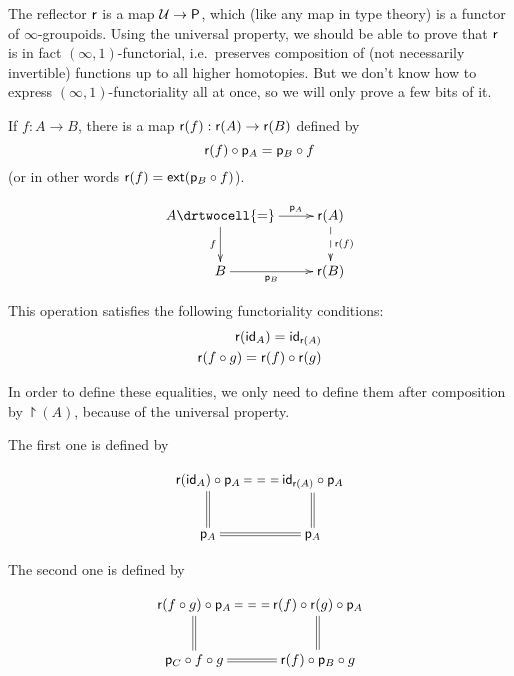 The reflector $\reflect$ is a map $\type\to\P$, which (like any map in type theory) is a functor of $\infty$-groupoids.
Using the universal property, we should be able to prove that $\reflect$ is in fact $(\infty,1)$-functorial, i.e.\ preserves composition of (not necessarily invertible) functions up to all higher homotopies.
But we don't know how to express $(\infty,1)$-functoriality all at once, so we will only prove a few bits of it.

\begin{defn}
  If $f:A\to{}B$, there is a map $\reflect(f):\reflect(A)\to\reflect(B)$ defined
  by
  \[\reflect(f)\circ\project_A=\project_B\circ{}f\]
  (or in other words $\reflect(f)=\ext(\project_B\circ{}f)$).

  \[\uppercurveobject{{ }}\lowercurveobject{{ }}\twocellhead{{ }}
  \xymatrix{A \ar^-{\project_A}[r] \ar_-f[d] \drtwocell{=} & \reflect(A)
    \ar@{-->}^-{\reflect(f)}[d]
    \\ B \ar_-{\project_B}[r] & \reflect(B)}\]

  This operation satisfies the following functoriality conditions:
  \begin{align*}
    \reflect(\idfunc[A])=\idfunc[\reflect(A)]\\
    \reflect(f\circ{}g)=\reflect(f)\circ\reflect(g)
  \end{align*}

  In order to define these equalities, we only need to define them after
  composition by $\project(A)$, because of the universal property.

  The first one is defined by

  \[\xymatrix{
    \reflect(\idfunc[A])\circ\project_A \ar@{==}[r] \ar@{=}[d] &
    \idfunc[\reflect(A)]\circ\project_A \ar@{=}[d] \\
    \project_A \ar@{=}[r] & \project_A
  }\]

  The second one is defined by

  \[\xymatrix{
    \reflect(f\circ g)\circ\project_A \ar@{==}[r] \ar@{=}[d] &
    \reflect(f)\circ\reflect(g)\circ\project_A \ar@{=}[d] \\
    \project_C\circ f\circ g \ar@{=}[r] & \reflect(f)\circ\project_B\circ g
  }\]
\end{defn}


